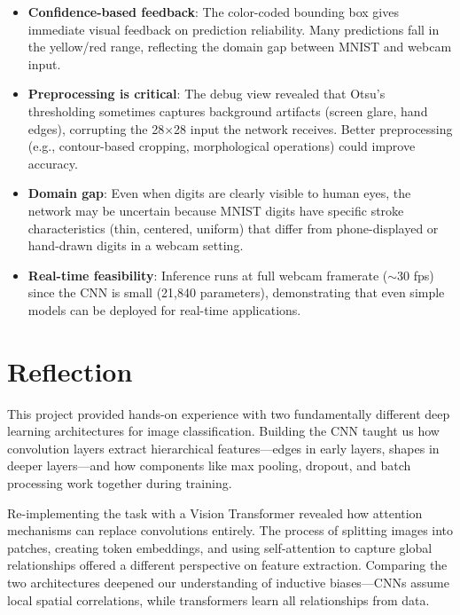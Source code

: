 \documentclass[11pt]{article}
\begin{document}
\begin{itemize}
    \item \textbf{Confidence-based feedback}: The color-coded bounding box gives immediate visual feedback on prediction reliability. Many predictions fall in the yellow/red range, reflecting the domain gap between MNIST and webcam input.
    
    \item \textbf{Preprocessing is critical}: The debug view revealed that Otsu's thresholding sometimes captures background artifacts (screen glare, hand edges), corrupting the 28$\times$28 input the network receives. Better preprocessing (e.g., contour-based cropping, morphological operations) could improve accuracy.
    
    \item \textbf{Domain gap}: Even when digits are clearly visible to human eyes, the network may be uncertain because MNIST digits have specific stroke characteristics (thin, centered, uniform) that differ from phone-displayed or hand-drawn digits in a webcam setting.
    
    \item \textbf{Real-time feasibility}: Inference runs at full webcam framerate ($\sim$30 fps) since the CNN is small (21,840 parameters), demonstrating that even simple models can be deployed for real-time applications.
\end{itemize}

\section{Reflection}

This project provided hands-on experience with two fundamentally different deep learning architectures for image classification. Building the CNN taught us how convolution layers extract hierarchical features—edges in early layers, shapes in deeper layers—and how components like max pooling, dropout, and batch processing work together during training.

Re-implementing the task with a Vision Transformer revealed how attention mechanisms can replace convolutions entirely. The process of splitting images into patches, creating token embeddings, and using self-attention to capture global relationships offered a different perspective on feature extraction. Comparing the two architectures deepened our understanding of inductive biases—CNNs assume local spatial correlations, while transformers learn all relationships from data.
\end{document}
